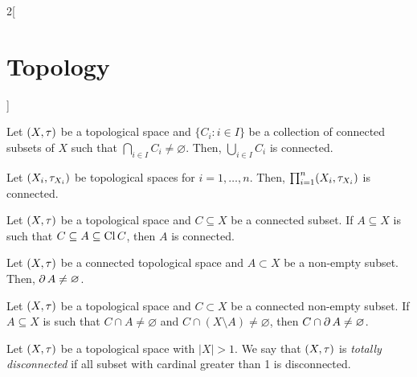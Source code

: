 \documentclass[../../../main.tex]{subfiles}
\begin{document}
\begin{multicols}{2}[\section{Topology}]
\begin{lemma}
  \end{lemma}
  \begin{prop}
    Let $(X,\tau)$ be a topological space and $\{C_i:i\in I\}$ be a collection of connected subsets of $X$ such that $\bigcap_{i\in I} C_i\ne\varnothing$. Then, $\bigcup_{i\in I} C_i$ is connected.
  \end{prop}
  \begin{theorem}
    Let $(X_i,\tau_{X_i})$ be topological spaces for $i=1,\ldots,n$. Then, $\prod_{i=1}^n(X_i,\tau_{X_i})$ is connected.
  \end{theorem}
  \begin{theorem}
    Let $(X,\tau)$ be a topological space and $C\subseteq X$ be a connected subset. If $A\subseteq X$ is such that $C\subseteq A\subseteq \operatorname{Cl} C$, then $A$ is connected.
  \end{theorem}
  \begin{prop}
    Let $(X,\tau)$ be a connected topological space and $A\subset X$ be a non-empty subset. Then, $\operatorname{\partial} A\ne\varnothing$.
  \end{prop}
  \begin{prop}
    Let $(X,\tau)$ be a topological space and $C\subset X$ be a connected non-empty subset. If $A\subseteq X$ is such that $C\cap A\ne\varnothing$ and $C\cap(X\setminus A)\ne\varnothing$, then $C\cap\operatorname{\partial} A\ne\varnothing$.
  \end{prop}
  \begin{definition}
    Let $(X,\tau)$ be a topological space with $|X|>1$. We say that $(X,\tau)$ is \textit{totally disconnected} if all subset with cardinal greater than 1 is disconnected.
  \end{definition}

\end{multicols}
\end{document}
